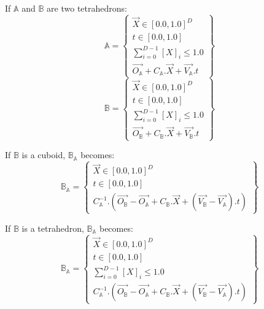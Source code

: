 \documentclass[12pt, a4paper]{article}
\begin{document}
If $\mathbb{A}$ and $\mathbb{B}$ are two tetrahedrons:
\begin{equation}
\mathbb{A}=\left\lbrace
\begin{array}{c}
\overrightarrow{X}\in[0.0,1.0]^D\\
t\in[0.0,1.0]\\
\sum_{i=0}^{D-1}\left[X\right]_i\le1.0\\
\overrightarrow{O_\mathbb{A}}+C_\mathbb{A}.\overrightarrow{X}+\overrightarrow{V_\mathbb{A}}.t
\end{array}
\right\rbrace
\end{equation}
\begin{equation}
\mathbb{B}=\left\lbrace
\begin{array}{c}
\overrightarrow{X}\in[0.0,1.0]^D\\
t\in[0.0,1.0]\\
\sum_{i=0}^{D-1}\left[X\right]_i\le1.0\\
\overrightarrow{O_\mathbb{B}}+C_\mathbb{B}.\overrightarrow{X}+\overrightarrow{V_\mathbb{B}}.t
\end{array}
\right\rbrace
\end{equation}

If $\mathbb{B}$ is a cuboid, $\mathbb{B}_\mathbb{A}$ becomes:
\begin{equation}
\mathbb{B}_\mathbb{A}=\left\lbrace
\begin{array}{c}
\overrightarrow{X}\in[0.0,1.0]^D\\
t\in[0.0,1.0]\\
C_\mathbb{A}^{-1}.\left(\overrightarrow{O_\mathbb{B}}-\overrightarrow{O_\mathbb{A}}+C_\mathbb{B}.\overrightarrow{X}+\left(\overrightarrow{V_\mathbb{B}}-\overrightarrow{V_\mathbb{A}}\right).t\right)
\end{array}
\right\rbrace
\end{equation}

If $\mathbb{B}$ is a tetrahedron, $\mathbb{B}_\mathbb{A}$ becomes:
\begin{equation}
\mathbb{B}_\mathbb{A}=\left\lbrace
\begin{array}{c}
\overrightarrow{X}\in[0.0,1.0]^D\\
t\in[0.0,1.0]\\
\sum_{i=0}^{D-1}\left[X\right]_i\le1.0\\
C_\mathbb{A}^{-1}.\left(\overrightarrow{O_\mathbb{B}}-\overrightarrow{O_\mathbb{A}}+C_\mathbb{B}.\overrightarrow{X}+\left(\overrightarrow{V_\mathbb{B}}-\overrightarrow{V_\mathbb{A}}\right).t\right)
\end{array}
\right\rbrace
\end{equation}
\end{document}
